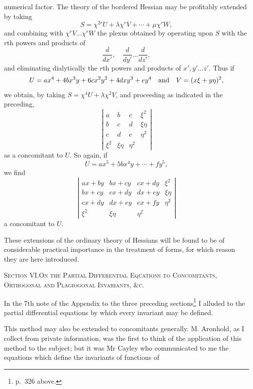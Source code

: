 \documentclass[11pt]{article}
\newcommand{\subpaperhead}[1]{\begin{center}{\large\scshape #1}\end{center}}
\newcommand{\sourcepage}[1]{\marginpar{\scriptsize p.~#1}}
\begin{document}
\sourcepage{351}
numerical factor. The theory of the bordered Hessian may be profitably extended by taking
\[
S=\chi^{2r}U+\lambda\chi^rV+\cdots+\mu\chi^rW,
\]
and combining with $\chi^rV\ldots\chi^rW$ the plexus obtained by operating upon $S$ with the $r$th powers and products of
\[
\frac{d}{dx'},\quad \frac{d}{dy'}\ldots \frac{d}{dz'},
\]
and eliminating dialytically the $r$th powers and products of $x',y'\ldots z'$. Thus if
\[
U=ax^4+4bx^3y+6cx^2y^2+4dxy^3+ey^4
\quad\hbox{and}\quad
V=(x\xi+y\eta)^2,
\]
we obtain, by taking $S=\chi^4U+\lambda\chi^2V$, and proceeding as indicated in the preceding,
\[
\left|\begin{array}{cccc}
a&b&c&\xi^2\\
b&c&d&\xi\eta\\
c&d&e&\eta^2\\
\xi^2&\xi\eta&\eta^2&
\end{array}\right|
\]
as a concomitant to $U$. So again, if
\[
U=ax^5+5bx^4y+\cdots+fy^5,
\]
we find
\[
\left|\begin{array}{cccc}
ax+by&bx+cy&cx+dy&\xi^2\\
bx+cy&cx+dy&dx+ey&\xi\eta\\
cx+dy&dx+ey&ex+fy&\eta^2\\
\xi^2&\xi\eta&\eta^2&
\end{array}\right|
\]
a concomitant to $U$.

These extensions of the ordinary theory of Hessians will be found to be of considerable practical importance in the treatment of forms, for which reason they are here introduced.

\subpaperhead{Section VI.\quad On the Partial Differential Equations to Concomitants,\\ Orthogonal and Plagiogonal Invariants, \&c.}

In the 7th note of the Appendix to the three preceding sections\footnote{p.~326 above.} I alluded to the partial differential equations by which every invariant may be defined.

This method may also be extended to concomitants generally. M. Aronhold, as I collect from private information, was the first to think of the application of this method to the subject; but it was Mr Cayley who communicated to me the equations which define the invariants of functions of
\end{document}
